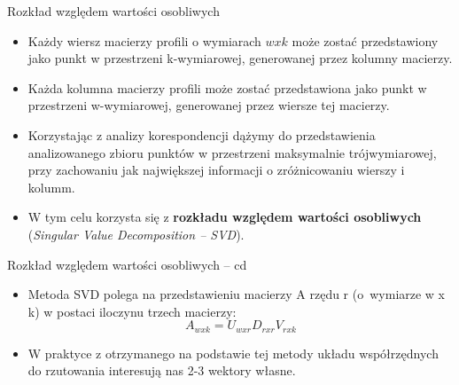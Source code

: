 \documentclass{beamer}
\begin{document}
\begin{frame}{Rozkład względem wartości osobliwych}
  \begin{itemize}
  \item Każdy wiersz macierzy profili o wymiarach $wxk$ może zostać przedstawiony jako punkt w przestrzeni k-wymiarowej, generowanej przez kolumny macierzy.
  \item Każda kolumna macierzy profili może zostać przedstawiona jako punkt w przestrzeni w-wymiarowej, generowanej przez wiersze tej macierzy.
  \item Korzystając z analizy korespondencji dążymy do przedstawienia analizowanego zbioru punktów w przestrzeni maksymalnie trójwymiarowej, przy zachowaniu jak największej informacji o zróżnicowaniu wierszy i kolumm.
  \item W tym celu korzysta się z \textbf{rozkładu względem wartości osobliwych} (\emph{Singular Value Decomposition -- SVD}).
  \end{itemize}
\end{frame}

\begin{frame}{Rozkład względem wartości osobliwych -- cd}
  \begin{itemize}
  \item Metoda SVD polega na przedstawieniu macierzy A rzędu r (o~wymiarze w x k) w postaci iloczynu trzech macierzy:
    $$A_{wxk} = U_{wxr} D_{rxr} V_{rxk}$$
    \item W praktyce z otrzymanego na podstawie tej metody układu współrzędnych do rzutowania interesują nas 2-3 wektory własne.
  \end{itemize}
\end{frame}
\end{document}
